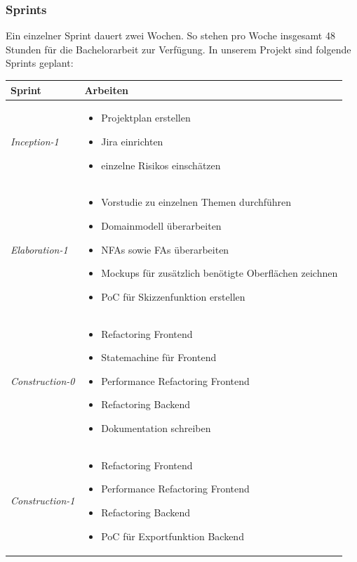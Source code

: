 \subsubsection*{Sprints}
Ein einzelner Sprint dauert zwei Wochen. So stehen pro Woche insgesamt 48 Stunden für die Bachelorarbeit zur Verfügung. In unserem Projekt sind folgende Sprints geplant:

\begin{center}
	\begin{longtable}{| l | p{10cm} |}
		\hline
		\textbf{Sprint} & \textbf{Arbeiten}\\
		\hline
		\textit{Inception-1 } & 
			\begin{itemize}[noitemsep]
				\item Projektplan erstellen
				\item Jira einrichten
				\item einzelne Risikos einschätzen
			\end{itemize}\\
		\hline
		\textit{Elaboration-1 } & 
			\begin{itemize}[noitemsep]
				\item Vorstudie zu einzelnen Themen durchführen
				\item Domainmodell überarbeiten
				\item NFAs sowie FAs überarbeiten
				\item Mockups für zusätzlich benötigte Oberflächen zeichnen
				\item PoC für Skizzenfunktion erstellen
			\end{itemize}\\
		\hline
		\textit{Construction-0 } & 
			\begin{itemize}[noitemsep]
				\item Refactoring Frontend
				\item Statemachine für Frontend
				\item Performance Refactoring Frontend
				\item Refactoring Backend
				\item Dokumentation schreiben
			\end{itemize}\\
		\hline
		\textit{Construction-1 } & 
			\begin{itemize}[noitemsep]
				\item Refactoring Frontend
				\item Performance Refactoring Frontend
				\item Refactoring Backend
				\item PoC für Exportfunktion Backend

\end{itemize}
\end{longtable}
\end{center}
